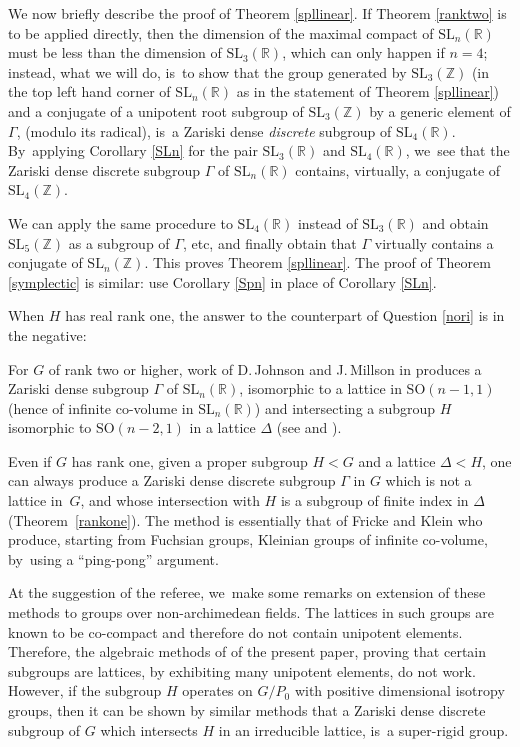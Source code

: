 \documentclass[JEP,XML,SOM,Unicode,published]{cedram}
\newcommand{\SO}{\mathrm{SO}}
\theoremstyle{definition}
\newcommand{\field}[1]{\mathbb{#1}}
\newcommand{\R}{\field{R}}
\newcommand{\Z}{\field{Z}}
\newcommand{\SL}{\mathrm{SL}}
\begin{document}
We now briefly describe the proof of Theorem \ref{spllinear}. If Theorem
\ref{ranktwo} is to be applied directly, then the dimension of the
maximal compact of $\SL_n(\R)$ must be less than the dimension of
$\SL_3(\R)$, which can only happen if $n=4$; instead, what we will do,
is~to show that the group generated by $\SL_3(\Z)$ (in the top left
hand corner of $\SL_n(\R)$ as in the statement of Theorem
\ref{spllinear}) and a conjugate of a unipotent root subgroup of
$\SL_3(\Z)$ by a generic element of $\Gamma $,
(modulo its radical), is~a Zariski dense \emph{discrete} subgroup of
$\SL_4(\R)$. By~applying Corollary \ref{SLn} for the pair $\SL_3(\R)$
and $\SL_4(\R)$, we~see that the Zariski dense discrete subgroup
$\Gamma $ of $\SL_n(\R)$ contains, virtually, a conjugate of
$\SL_4(\Z)$.

We can apply the same procedure to $\SL_4(\R)$ instead of $\SL_3(\R)$ and obtain
$\SL_5(\Z)$ as a subgroup of $\Gamma $, etc, and finally obtain that
$\Gamma $ virtually contains a conjugate of $\SL_n(\Z)$. This proves
Theorem \ref{spllinear}. The proof of Theorem \ref{symplectic} is
similar: use Corollary \ref{Spn} in place of Corollary \ref{SLn}.

When $H$ has real rank one, the answer to the counterpart of Question
\ref{nori} is in the negative:

For $G$ of rank two or higher, work of D.\,Johnson and J.\,Millson in \cite{J-M}
produces a Zariski dense subgroup $\Gamma$ of $\SL_n(\R)$, isomorphic to a
lattice in $\SO(n-1,1)$ (hence of infinite co-volume in $\SL_n(\R)$)
and intersecting a subgroup $H$ isomorphic to
$\SO(n-2,1)$ in a lattice $\Delta$
(see \cite[Rem.\,1.3]{Ben1} and \cite[Cor.\,2.10]{Ben2}).

Even if $G$ has rank one, given a proper subgroup $H< G$ and a
lattice $\Delta < H$, one can always produce a Zariski dense
discrete subgroup $\Gamma$ in $G$ which is not a lattice in~$G$, and
whose intersection with $H$ is a subgroup of finite index in $\Delta$
(Theorem~\ref{rankone}). The method is essentially that of Fricke and
Klein \cite{F-K} who produce, starting from Fuchsian groups, Kleinian
groups of infinite co-volume, by~using a ``ping-pong'' argument.

At the suggestion of the referee, we~make some remarks on extension of
these methods to groups over non-archimedean fields. The lattices in
such groups are known to be co-compact and therefore do not contain
unipotent elements. Therefore, the algebraic methods of of the
present paper, proving that certain subgroups are lattices, by
exhibiting many unipotent elements, do not work. However, if the subgroup
$H$ operates on $G/P_0$ with positive dimensional isotropy groups,
then it can be shown by similar methods that a Zariski dense discrete
subgroup of $G$ which intersects $H$ in an irreducible lattice, is~a
super-rigid group.\enlargethispage{\baselineskip}
\end{document}

